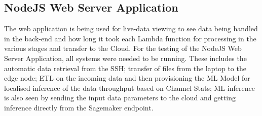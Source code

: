 \subsection{NodeJS Web Server Application}
The web application is being used for live-data viewing to see data being handled in the back-end and how long it took each Lambda function for processing in the various stages and transfer to the Cloud. For the testing of the NodeJS Web Server Application, all systems were needed to be running. These includes the automatic data retrieval from the SSH; transfer of files from the laptop to the edge node; ETL on the incoming data and then provisioning the ML Model for localised inference of the data throughput based on Channel Stats; ML-inference is also seen by sending the input data parameters to the cloud and getting inference directly from the Sagemaker endpoint. 

